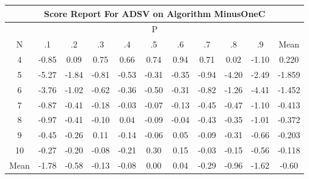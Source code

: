 \documentclass[11pt,a4paper]{report}
\begin{document}
\begin{longtable}{ | c || c | c | c | c | c | c | c | c | c || c |}
\hline
\multicolumn{11}{|c|}{ Score Report For ADSV on Algorithm MinusOneC} \\
\hline
\multicolumn{11}{|c|}{ P } \\
\hline
N & .1 & .2 & .3 & .4 & .5 & .6 & .7 & .8 & .9 & Mean\\
 \hline
 \hline
 \endhead
  4 &  \cellcolor[HTML]{FFE7E7} -0.85 &  \cellcolor[HTML]{FFFFFF} 0.09 &  \cellcolor[HTML]{EFEFFF} 0.75 &  \cellcolor[HTML]{EFEFFF} 0.66 &  \cellcolor[HTML]{EFEFFF} 0.74 &  \cellcolor[HTML]{E7E7FF} 0.94 &  \cellcolor[HTML]{EFEFFF} 0.71 &  \cellcolor[HTML]{FFFFFF} 0.02 &  \cellcolor[HTML]{FFE7E7} -1.10 & 0.220 \\
  5 &  \cellcolor[HTML]{FF7878} -5.27 &  \cellcolor[HTML]{FFCFCF} -1.84 &  \cellcolor[HTML]{FFE7E7} -0.81 &  \cellcolor[HTML]{FFEFEF} -0.53 &  \cellcolor[HTML]{FFF7F7} -0.31 &  \cellcolor[HTML]{FFF7F7} -0.35 &  \cellcolor[HTML]{FFE7E7} -0.94 &  \cellcolor[HTML]{FF9797} -4.20 &  \cellcolor[HTML]{FFBFBF} -2.49 & -1.859 \\
  6 &  \cellcolor[HTML]{FF9F9F} -3.76 &  \cellcolor[HTML]{FFE7E7} -1.02 &  \cellcolor[HTML]{FFEFEF} -0.62 &  \cellcolor[HTML]{FFF7F7} -0.36 &  \cellcolor[HTML]{FFEFEF} -0.50 &  \cellcolor[HTML]{FFF7F7} -0.31 &  \cellcolor[HTML]{FFE7E7} -0.82 &  \cellcolor[HTML]{FFDFDF} -1.26 &  \cellcolor[HTML]{FF8F8F} -4.41 & -1.452 \\
  7 &  \cellcolor[HTML]{FFE7E7} -0.87 &  \cellcolor[HTML]{FFF7F7} -0.41 &  \cellcolor[HTML]{FFF7F7} -0.18 &  \cellcolor[HTML]{FFFFFF} -0.03 &  \cellcolor[HTML]{FFFFFF} -0.07 &  \cellcolor[HTML]{FFFFFF} -0.13 &  \cellcolor[HTML]{FFF7F7} -0.45 &  \cellcolor[HTML]{FFF7F7} -0.47 &  \cellcolor[HTML]{FFE7E7} -1.10 & -0.413 \\
  8 &  \cellcolor[HTML]{FFE7E7} -0.97 &  \cellcolor[HTML]{FFF7F7} -0.41 &  \cellcolor[HTML]{FFFFFF} -0.10 &  \cellcolor[HTML]{FFFFFF} 0.04 &  \cellcolor[HTML]{FFFFFF} -0.09 &  \cellcolor[HTML]{FFFFFF} -0.04 &  \cellcolor[HTML]{FFF7F7} -0.43 &  \cellcolor[HTML]{FFF7F7} -0.35 &  \cellcolor[HTML]{FFE7E7} -1.01 & -0.372 \\
  9 &  \cellcolor[HTML]{FFF7F7} -0.45 &  \cellcolor[HTML]{FFF7F7} -0.26 &  \cellcolor[HTML]{FFFFFF} 0.11 &  \cellcolor[HTML]{FFFFFF} -0.14 &  \cellcolor[HTML]{FFFFFF} -0.06 &  \cellcolor[HTML]{FFFFFF} 0.05 &  \cellcolor[HTML]{FFFFFF} -0.09 &  \cellcolor[HTML]{FFF7F7} -0.31 &  \cellcolor[HTML]{FFEFEF} -0.66 & -0.203 \\
  10 &  \cellcolor[HTML]{FFF7F7} -0.27 &  \cellcolor[HTML]{FFF7F7} -0.20 &  \cellcolor[HTML]{FFFFFF} -0.08 &  \cellcolor[HTML]{FFF7F7} -0.21 &  \cellcolor[HTML]{F7F7FF} 0.30 &  \cellcolor[HTML]{FFFFFF} 0.15 &  \cellcolor[HTML]{FFFFFF} -0.03 &  \cellcolor[HTML]{FFFFFF} -0.15 &  \cellcolor[HTML]{FFEFEF} -0.56 & -0.118 \\
 \hline
 \hline
Mean &  \cellcolor[HTML]{FFCFCF} -1.78 &  \cellcolor[HTML]{FFEFEF} -0.58 &  \cellcolor[HTML]{FFFFFF} -0.13 &  \cellcolor[HTML]{FFFFFF} -0.08 &  \cellcolor[HTML]{FFFFFF} 0.00 &  \cellcolor[HTML]{FFFFFF} 0.04 &  \cellcolor[HTML]{FFF7F7} -0.29 &  \cellcolor[HTML]{FFE7E7} -0.96 &  \cellcolor[HTML]{FFD7D7} -1.62 &  \cellcolor[HTML]{FFEFEF} -0.60
\end{longtable}
\end{document}
